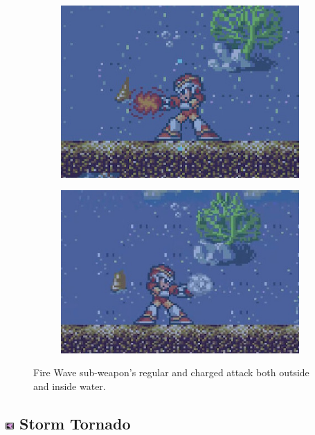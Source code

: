 \begin{figure}[htp]
	\ContinuedFloat
	\centering
	\begin{subfigure}[c]{0.35\linewidth}
		\centering
		\includegraphics[width=\linewidth]{figures/X1/weapons/Fire_wave_2.jpg}
	\end{subfigure}
	\begin{subfigure}[c]{0.35\linewidth}
		\centering
		\includegraphics[width=\linewidth]{figures/X1/weapons/Fire_wave_4.jpg}
	\end{subfigure}
	\caption{Fire Wave sub-weapon's regular and charged attack both outside and inside water.}
\end{figure}


\subsection{\includegraphics[width=12px, height=10px]{figures/X1/weapons/Storm_T.jpg} Storm Tornado}\label{Storm_tornado}

